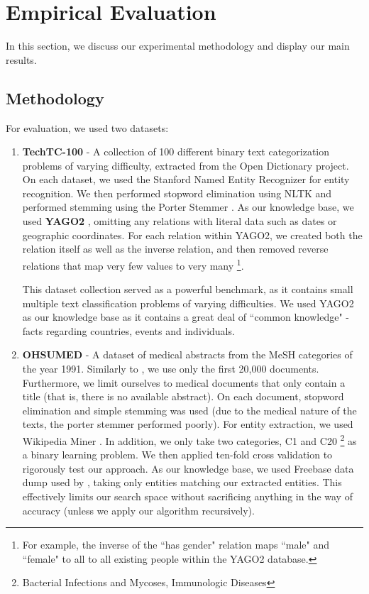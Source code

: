 \documentclass[twoside,11pt]{article}
\theoremstyle{definition}
\begin{document}
\section{Empirical Evaluation}
In this section, we discuss our experimental methodology and display our main results.
\subsection{Methodology}

For evaluation, we used two datasets:
\begin{enumerate}
	\item \textbf{TechTC-100} \cite{gabrilovich2004text} - A collection of 100 different binary text categorization problems of varying difficulty, extracted from the Open Dictionary project. On each dataset, we used the Stanford Named Entity Recognizer \cite{finkel2005incorporatingfull} for entity recognition. We then performed stopword elimination using NLTK \cite{bird2009natural} and performed stemming using the Porter Stemmer \cite{van1980new}.
	As our knowledge base, we used \textbf{YAGO2} \cite{hoffart2013yago2}, omitting any relations with literal data such as dates or geographic coordinates. For each relation within YAGO2, we created both the relation itself as well as the inverse relation, and then removed reverse relations that map very few values to very many \footnote{For example, the inverse of the ``has gender" relation  maps ``male" and ``female" to all to all existing people within the YAGO2 database.}.
	
	This dataset collection served as a powerful benchmark, as it contains small multiple text classification problems of varying difficulties. We used YAGO2 as our knowledge base as it contains a great deal of ``common knowledge" - facts regarding countries, events and individuals.
	\item \textbf{OHSUMED} \cite{hersh1994ohsumed} - A dataset of medical abstracts from the MeSH categories of the year 1991. Similarly to , we use only the first 20,000 documents. Furthermore, we limit ourselves to medical documents that only contain a title (that is, there is no available abstract). On each document, stopword elimination and simple stemming was used (due to the medical nature of the texts, the porter stemmer performed poorly). For entity extraction, we used Wikipedia Miner \cite{milne2013open}.  In addition, we only take two categories, C1 and C20 \footnote{Bacterial Infections and Mycoses, Immunologic Diseases} as a binary learning problem. We then applied ten-fold cross validation to rigorously test  our approach.
	As our knowledge base, we used Freebase data dump used by , taking only entities matching our extracted entities. This effectively limits our search space without sacrificing anything in the way of accuracy (unless we apply our algorithm recursively).
	

\end{enumerate}
\end{document}
